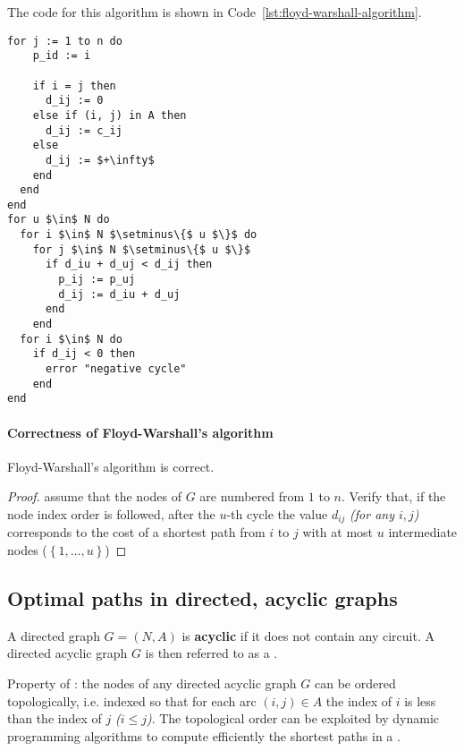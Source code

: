\documentclass[english]{article}
\begin{document}
\bigskip
The code for this algorithm is shown in Code~\ref{lst:floyd-warshall-algorithm}.

\begin{lstlisting}[style=custom, language=pseudocode, caption={Floyd-Warshall's algorithm}, label={lst:floyd-warshall-algorithm}, float]
  for j := 1 to n do
    p_id := i

    if i = j then
      d_ij := 0
    else if (i, j) in A then
      d_ij := c_ij
    else
      d_ij := $+\infty$
    end
  end
end
for u $\in$ N do
  for i $\in$ N $\setminus\{$ u $\}$ do
    for j $\in$ N $\setminus\{$ u $\}$
      if d_iu + d_uj < d_ij then
        p_ij := p_uj
        d_ij := d_iu + d_uj
      end
    end
  for i $\in$ N do
    if d_ij < 0 then
      error "negative cycle"
    end
end
\end{lstlisting}

\paragraph{Correctness of Floyd-Warshall's algorithm}

\begin{proposition}
  Floyd-Warshall's algorithm is correct.
\end{proposition}

\begin{proof}
  assume that the nodes of \(G\) are numbered from \(1\) to \(n\).
  Verify that, if the node index order is followed, after the \(u\)-th cycle the value \(d_{ij}\) \textit{(for any \(i, j\))} corresponds to the cost of a shortest path from \(i\) to \(j\) with at most \(u\) intermediate nodes (\(\left\{ 1, \ldots, u \right\}\))
\end{proof}

\subsection{Optimal paths in directed, acyclic graphs}

A directed graph \(G = (N, A)\) is \textbf{acyclic} if it does not contain any circuit.
A directed acyclic graph \(G\) is then referred to as a \textbf{\DAG}.

Property of \textit{\DAGs}: the nodes of any directed acyclic graph \(G\) can be ordered topologically, i.e. indexed so that for each arc \((i, j) \in A\) the index of \(i\) is less than the index of \(j\) \textit{(\(i \leq j\))}.
The topological order can be exploited by dynamic programming algorithms to compute efficiently the shortest paths in a \DAG.
\end{document}
